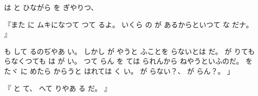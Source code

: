 
は
と
ひながら
を
ぎやりつ、

『また
に
ムキになつて
つて
るよ。
いくら
の
が
あるからといつて
な
だナ。
』

も
して
るのぢやあ
い。
しかし
が
やうと
ふことを
らないとは
だ。
が
りても
らなくつても
は
が
い。
つて
らん
を
ては
られんから
ねやうといふのだ。
をたヾ
に
めたら
からうと
はれては
く
い。
が
らない？、
が
らん？。
」

『
と
て、
へて
りやあ
る
だ。
』


